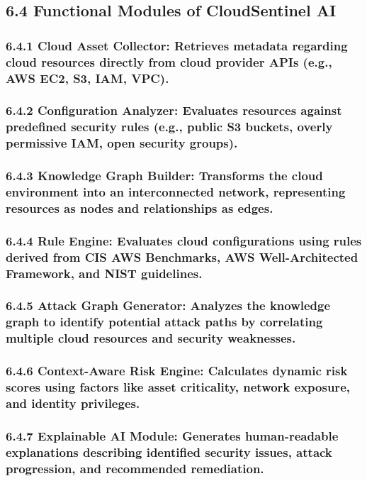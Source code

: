 \subsection{6.4 Functional Modules of CloudSentinel AI}

\subsubsection{6.4.1 Cloud Asset Collector: Retrieves metadata regarding cloud resources directly from cloud provider APIs (e.g., AWS EC2, S3, IAM, VPC).}

\subsubsection{6.4.2 Configuration Analyzer: Evaluates resources against predefined security rules (e.g., public S3 buckets, overly permissive IAM, open security groups).}

\subsubsection{6.4.3 Knowledge Graph Builder: Transforms the cloud environment into an interconnected network, representing resources as nodes and relationships as edges.}

\subsubsection{6.4.4 Rule Engine: Evaluates cloud configurations using rules derived from CIS AWS Benchmarks, AWS Well-Architected Framework, and NIST guidelines.}

\subsubsection{6.4.5 Attack Graph Generator: Analyzes the knowledge graph to identify potential attack paths by correlating multiple cloud resources and security weaknesses.}

\subsubsection{6.4.6 Context-Aware Risk Engine: Calculates dynamic risk scores using factors like asset criticality, network exposure, and identity privileges.}

\subsubsection{6.4.7 Explainable AI Module: Generates human-readable explanations describing identified security issues, attack progression, and recommended remediation.}

